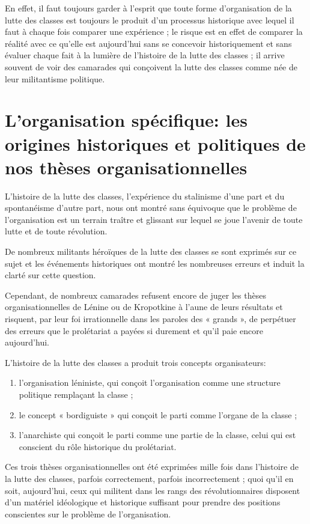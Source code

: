 En effet, il faut toujours garder à l'esprit que toute forme d'organisation de la lutte des classes est toujours le produit d'un processus historique avec lequel il faut à chaque fois comparer une expérience ; le risque est en effet de comparer la réalité avec ce qu'elle est aujourd'hui sans se concevoir historiquement et sans évaluer chaque fait à la lumière de l'histoire de la lutte des classes ; il arrive souvent de voir des camarades qui conçoivent la lutte des classes comme née de leur militantisme politique.

\chapter{L'organisation spécifique: les origines historiques et politiques de nos thèses organisationnelles}

L'histoire de la lutte des classes, l'expérience du stalinisme d'une part et du spontanéisme d'autre part, nous ont montré sans équivoque que le problème de l'organisation est un terrain traître et glissant sur lequel se joue l'avenir de toute lutte et de toute révolution.

De nombreux militants héroïques de la lutte des classes se sont exprimés sur ce sujet et les événements historiques ont montré les nombreuses erreurs et induit la clarté sur cette question.

Cependant, de nombreux camarades refusent encore de juger les thèses organisationnelles de Lénine ou de Kropotkine à l'aune de leurs résultats et risquent, par leur foi irrationnelle dans les paroles des « grands », de perpétuer des erreurs que le prolétariat a payées si durement et qu'il paie encore aujourd'hui.

L'histoire de la lutte des classes a produit trois concepts organisateurs:

\begin{enumerate}
\item{} l'organisation léniniste, qui conçoit l'organisation comme une structure politique remplaçant la classe ;
\item{} le concept « bordiguiste » qui conçoit le parti comme l'organe de la classe ;
\item{} l'anarchiste qui conçoit le parti comme une partie de la classe, celui qui est conscient du rôle historique du prolétariat.
\end{enumerate}

Ces trois thèses organisationnelles ont été exprimées mille fois dans l'histoire de la lutte des classes, parfois correctement, parfois incorrectement ; quoi qu'il en soit, aujourd'hui, ceux qui militent dans les rangs des révolutionnaires disposent d'un matériel idéologique et historique suffisant pour prendre des positions conscientes sur le problème de l'organisation.

